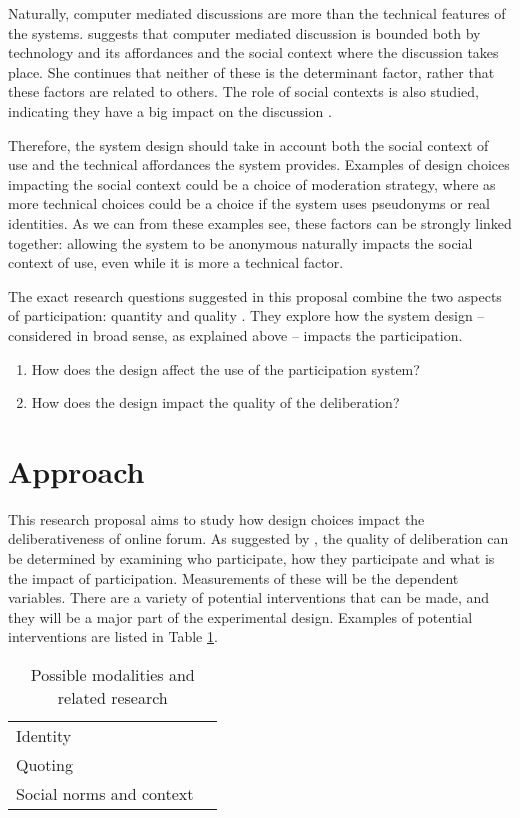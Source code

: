 \documentclass[journal,a4paper]{IEEEtran}
\begin{document}
Naturally, computer mediated discussions are more than the technical features of the systems.  suggests that computer mediated discussion is bounded both by technology and its affordances and the social context where the discussion takes place. She continues that neither of these is the determinant factor, rather that these factors are related to others. The role of social contexts is also studied, indicating they have a big impact on the discussion \cite{sukumaran11,underhill03}.

Therefore, the system design should take in account both the social context of use and the technical affordances the system provides. Examples of design choices impacting the social context could be a choice of moderation strategy, where as more technical choices could be a choice if the system uses pseudonyms or real identities. As we can from these examples see, these factors can be strongly linked together: allowing the system to be anonymous naturally impacts the social context of use, even while it is more a technical factor.

The exact research questions suggested in this proposal combine the two aspects of participation: quantity and quality . They explore how the system design -- considered in broad sense, as explained above -- impacts the participation.

\begin{enumerate}
\item How does the design affect the use of the participation system?
\item How does the design impact the quality of the deliberation?
\end{enumerate}

\section{Approach}
This research proposal aims to study how design choices impact the deliberativeness of online forum. As suggested by , the quality of deliberation can be determined by examining who participate, how they participate and what is the impact of participation. Measurements of these will be the dependent variables. There are a variety of potential interventions that can be made, and they will be a major part of the experimental design. Examples of potential interventions are listed in Table \ref{tab:modalities}.

\begin{table}
\caption{Possible modalities and related research}
\begin{tabular}{ll}
Identity & \cite{danet98,donath99}  \\ 
Quoting & \cite{eklundh94} \\ 
Social norms and context & \cite{sukumaran11,underhill03} \\
\end{tabular} 
\label{tab:modalities}
\end{table}
\end{document}
